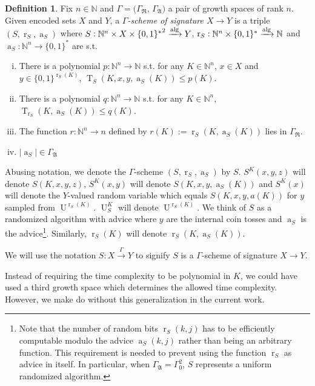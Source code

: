 \documentclass{article}
\numberwithin{equation}{section}
\theoremstyle{definition}
\newtheorem{definition}{Definition}[section]
\theoremstyle{plain}
\newcommand{\Words}{{\{ 0, 1 \}^*}}
\newcommand{\WordsLen}[1]{{\{ 0, 1 \}^{#1}}}
\DeclareMathOperator{\T}{T}
\DeclareMathOperator{\R}{r}
\DeclareMathOperator{\A}{a}
\DeclareMathOperator{\U}{U}
\newcommand{\Nats}{\mathbb{N}}
\newcommand{\Abs}[1]{\lvert #1 \rvert}
\newcommand{\GrowR}{\Gamma_{\mathfrak{R}}}
\newcommand{\GrowA}{\Gamma_{\mathfrak{A}}}
\newcommand{\Alg}{\xrightarrow{\textnormal{alg}}}
\newcommand{\Scheme}{\xrightarrow{\Gamma}}
\begin{document}
\begin{definition}

Fix $n \in \Nats$ and $\Gamma=(\GrowR$, $\GrowA)$ a pair of growth spaces of rank $n$. Given encoded sets $X$ and $Y$, a \emph{$\Gamma$-scheme of signature $X \rightarrow Y$} is a triple $(S,\R_S,\A_S)$ where $S: \Nats^n \times X \times \Words^2 \Alg Y$, $\R_S: \Nats^n \times \Words \Alg \Nats$ and $\A_S: \Nats^n \rightarrow \Words$ are s.t.

\begin{enumerate}[(i)]

\item There is a polynomial $p: \Nats^n \rightarrow \Nats$ s.t. for any $K \in \Nats^n$, $x \in X$ and $y \in \WordsLen{\R_S(K)}$, $\T_S(K,x,y,\A_S(K)) \leq p(K)$.

\item There is a polynomial $q: \Nats^n \rightarrow \Nats$ s.t. for any $K \in \Nats^n$, ${\T_{\R_S}(K,\A_S(K)) \leq q(K)}$.

\item The function $r: \Nats^n \rightarrow n$ defined by $r(K):=\R_S(K,\A_S(K))$ lies in $\GrowR$.

\item $\Abs{\A_S} \in \GrowA$

\end{enumerate}

Abusing notation, we denote the $\Gamma$-scheme $(S,\R_S,\A_S)$ by $S$. $S^K(x,y,z)$ will denote $S(K,x,y,z)$, $S^K(x,y)$ will denote $S(K,x,y,\A_S(K))$ and $S^K(x)$ will denote the $Y$-valued random variable which equals $S(K,x,y,a(K))$ for $y$ sampled from $\U^{\R_S(K)}$. $\U_S^K$ will denote $\U^{\R_S(K)}$. We think of $S$ as a randomized algorithm with advice where $y$ are the internal coin tosses and $\A_S$ is the advice\footnote{Note that the number of random bits $\R_S(k,j)$ has to be efficiently computable modulo the advice $\A_S(k,j)$ rather than being an arbitrary function. This requirement is needed to prevent using the function $\R_S$ as advice in itself. In particular, when $\GrowA=\Gamma_0^2$, $S$ represents a uniform randomized algorithm.}. Similarly, $\R_S(K)$ will denote $\R_S(K,\A_S(K))$.

We will use the notation $S: X \Scheme Y$ to signify $S$ is a $\Gamma$-scheme of signature $X \rightarrow Y$.

\end{definition}

Instead of requiring the time complexity to be polynomial in $K$, we could have used a third growth space which determines the allowed time complexity. However, we make do without this generalization in the current work.
\end{document}
